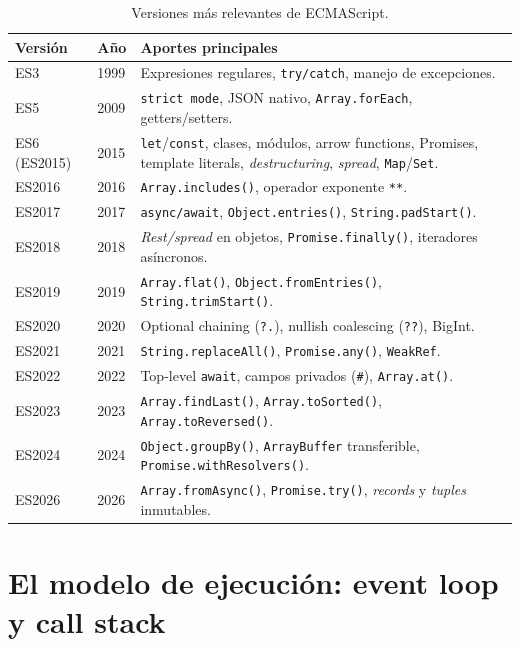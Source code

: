 \documentclass[11pt,a4paper,openany]{book}
\begin{document}
	\begin{table}[htbp]
		\centering
		\caption{Versiones más relevantes de ECMAScript.}
		\label{tab:4.ecma}
		\footnotesize
		\begin{tabularx}{\textwidth}{llX}
			\toprule
			\textbf{Versión} & \textbf{Año} & \textbf{Aportes principales}\\
			\midrule
			ES3        & 1999 & Expresiones regulares, \texttt{try/catch}, manejo de excepciones.\\
			ES5        & 2009 & \texttt{strict mode}, JSON nativo, \texttt{Array.forEach}, getters/setters.\\
			ES6 (ES2015) & 2015 & \texttt{let}/\texttt{const}, clases, módulos, arrow functions, Promises,
			template literals, \emph{destructuring}, \emph{spread}, \texttt{Map}/\texttt{Set}.\\
			ES2016     & 2016 & \texttt{Array.includes()}, operador exponente \texttt{**}.\\
			ES2017     & 2017 & \texttt{async/await}, \texttt{Object.entries()}, \texttt{String.padStart()}.\\
			ES2018     & 2018 & \emph{Rest/spread} en objetos, \texttt{Promise.finally()}, iteradores asíncronos.\\
			ES2019     & 2019 & \texttt{Array.flat()}, \texttt{Object.fromEntries()}, \texttt{String.trimStart()}.\\
			ES2020     & 2020 & Optional chaining (\texttt{?.}), nullish coalescing (\texttt{??}), BigInt.\\
			ES2021     & 2021 & \texttt{String.replaceAll()}, \texttt{Promise.any()}, \texttt{WeakRef}.\\
			ES2022     & 2022 & Top-level \texttt{await}, campos privados (\texttt{\#}), \texttt{Array.at()}.\\
			ES2023     & 2023 & \texttt{Array.findLast()}, \texttt{Array.toSorted()}, \texttt{Array.toReversed()}.\\
			ES2024     & 2024 & \texttt{Object.groupBy()}, \texttt{ArrayBuffer} transferible,
			\texttt{Promise.withResolvers()}.\\
			ES2026 \cite{ecma2024} & 2026 & \texttt{Array.fromAsync()}, \texttt{Promise.try()},
			\emph{records} y \emph{tuples} inmutables.\\
			\bottomrule
		\end{tabularx}
	\end{table}
	
	\section{El modelo de ejecución: event loop y call stack}
	\label{sec:4.eventloop}
	
\end{document}
